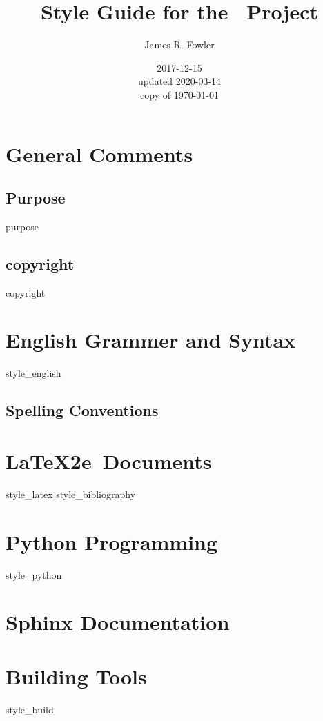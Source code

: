 \documentclass[twoside]{book}
\begin{document}
\frontmatter

\title{Style Guide for the \ProjectTitle\ Project}
\author{James R. Fowler}
\date{2017-12-15\\ updated 2020-03-14\\ copy of \today}

\maketitle

\tableofcontents

\mainmatter

\chapter{General Comments}
\section{Purpose}
{purpose}
\section{copyright}
{copyright}

\chapter{English Grammer and Syntax}
{style_english}
\section{Spelling Conventions}

\chapter{\LaTeX2e\ Documents}
{style_latex}
{style_bibliography}

\chapter{Python Programming}
{style_python}

\chapter{Sphinx Documentation}

\chapter{Building Tools}
{style_build}

\printbibliography


\backmatter
\end{document}
